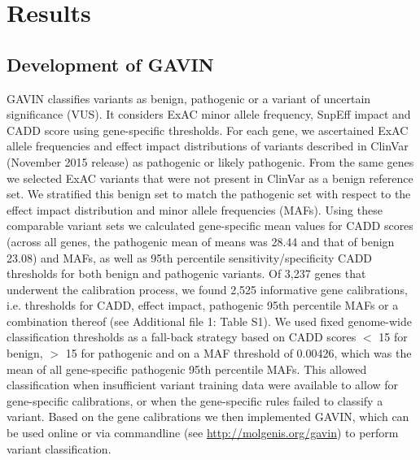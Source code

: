 \section{Results}

\subsection{Development of GAVIN}
GAVIN classifies variants as benign, pathogenic or a variant of uncertain significance (VUS).
It considers ExAC\cite{Lek_2016} minor allele frequency, SnpEff\cite{Cingolani_2012} impact and CADD score using gene-specific thresholds.
For each gene, we ascertained ExAC allele frequencies and effect impact distributions of variants described in ClinVar (November 2015 release) \cite{Landrum_2015} as pathogenic or likely pathogenic.
From the same genes we selected ExAC variants that were not present in ClinVar as a benign reference set.
We stratified this benign set to match the pathogenic set with respect to the effect impact distribution and minor allele frequencies (MAFs).
Using these comparable variant sets we calculated gene-specific mean values for CADD scores (across all genes, the pathogenic mean of means was 28.44 and that of benign 23.08) and MAFs, as well as 95th percentile sensitivity/specificity CADD thresholds for both benign and pathogenic variants.
Of 3,237 genes that underwent the calibration process, we found 2,525 informative gene calibrations, i.e. thresholds for CADD, effect impact, pathogenic 95th percentile MAFs or a combination thereof (see Additional file 1: Table S1).
We used fixed genome-wide classification thresholds as a fall-back strategy based on CADD scores $<$ 15 for benign, $>$ 15 for pathogenic and on a MAF threshold of 0.00426, which was the mean of all gene-specific pathogenic 95th percentile MAFs.
This allowed classification when insufficient variant training data were available to allow for gene-specific calibrations, or when the gene-specific rules failed to classify a variant.
Based on the gene calibrations we then implemented GAVIN, which can be used online or via commandline (see \url{http://molgenis.org/gavin}) to perform variant classification.


